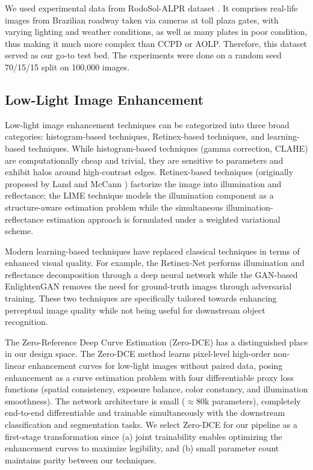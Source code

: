 \documentclass{ieeeaccess}
\begin{document}
We used experimental data from RodoSol-ALPR dataset \cite{b6}. It comprises real-life images from Brazilian roadway taken via cameras at toll plaza gates, with varying lighting and weather conditions, as well as many plates in poor condition, thus making it much more complex than CCPD or AOLP. Therefore, this dataset served as our go-to test bed. The experiments were done on a random seed 70/15/15 split on 100,000 images.

\subsection{Low-Light Image Enhancement}
Low-light image enhancement techniques can be categorized into three broad categories: histogram-based techniques, Retinex-based techniques, and learning-based techniques. While histogram-based techniques (gamma correction, CLAHE) are computationally cheap and trivial, they are sensitive to parameters and exhibit halos around high-contrast edges. Retinex-based techniques (originally proposed by Land and McCann \cite{b17}) factorize the image into illumination and reflectance; the LIME technique \cite{b19} models the illumination component as a structure-aware estimation problem while the simultaneous illumination-reflectance estimation approach \cite{b18} is formulated under a weighted variational scheme.

Modern learning-based techniques have replaced classical techniques in terms of enhanced visual quality. For example, the Retinex-Net \cite{b21} performs illumination and reflectance decomposition through a deep neural network while the GAN-based EnlightenGAN \cite{b20} removes the need for ground-truth images through adversarial training. These two techniques are specifically tailored towards enhancing perceptual image quality while not being useful for downstream object recognition.

The Zero-Reference Deep Curve Estimation (Zero-DCE) \cite{b2} has a distinguished place in our design space. The Zero-DCE method learns pixel-level high-order non-linear enhancement curves for low-light images without paired data, posing enhancement as a curve estimation problem with four differentiable proxy loss functions (spatial consistency, exposure balance, color constancy, and illumination smoothness). The network architecture is small ($\approx 80$k parameters), completely end-to-end differentiable and trainable simultaneously with the downstream classification and segmentation tasks. We select Zero-DCE for our pipeline as a first-stage transformation since (a) joint trainability enables optimizing the enhancement curves to maximize legibility, and (b) small parameter count maintains parity between our techniques.
\end{document}
